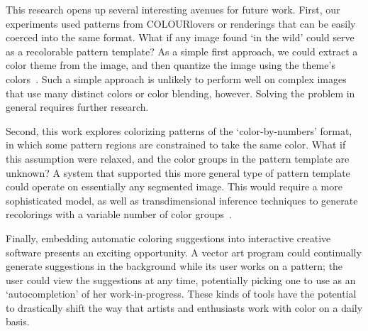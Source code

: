 

This research opens up several interesting avenues for future work.
First, our experiments used patterns from COLOURlovers or renderings that can be easily coerced into the same format. What if any image found `in the wild' could serve as a recolorable pattern template? As a simple first approach, we could extract a color theme from the image, and then quantize the image using the theme's colors~\cite{SharonPaletteExtraction}. Such a simple approach is unlikely to perform well on complex images that use many distinct colors or color blending, however. Solving the problem in general requires further research.

Second, this work explores colorizing patterns of the `color-by-numbers' format, in which some pattern regions are constrained to take the same color. What if this assumption were relaxed, and the color groups in the pattern template are unknown? A system that supported this more general type of pattern template could operate on essentially any segmented image. This would require a more sophisticated model, as well as transdimensional inference techniques to generate recolorings with a variable number of color groups~\cite{YiTingLARJ}.

Finally, embedding automatic coloring suggestions into interactive creative software presents an exciting opportunity. A vector art program could continually generate suggestions in the background while its user works on a pattern; the user could view the suggestions at any time, potentially picking one to use as an `autocompletion' of her work-in-progress. These kinds of tools have the potential to drastically shift the way that artists and enthusiasts work with color on a daily basis. 